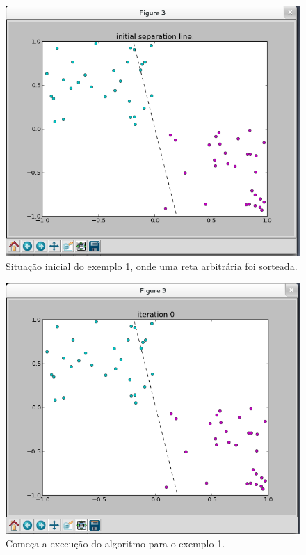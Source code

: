 \documentclass[brazil, a4paper]{article}
\begin{document}
\begin{itemize}
\begin{figure}[!htb]
\centering
\includegraphics[scale=0.25]{ex1-1.png}
\caption{Situação inicial do exemplo 1, onde uma reta arbitrária foi sorteada.}
\end{figure}

\newpage

\begin{figure}[!htb]
\centering
\includegraphics[scale=0.25]{ex1-2.png}
\caption{Começa a execução do algoritmo para o exemplo 1.}
\end{figure}


\end{itemize}
\end{document}
